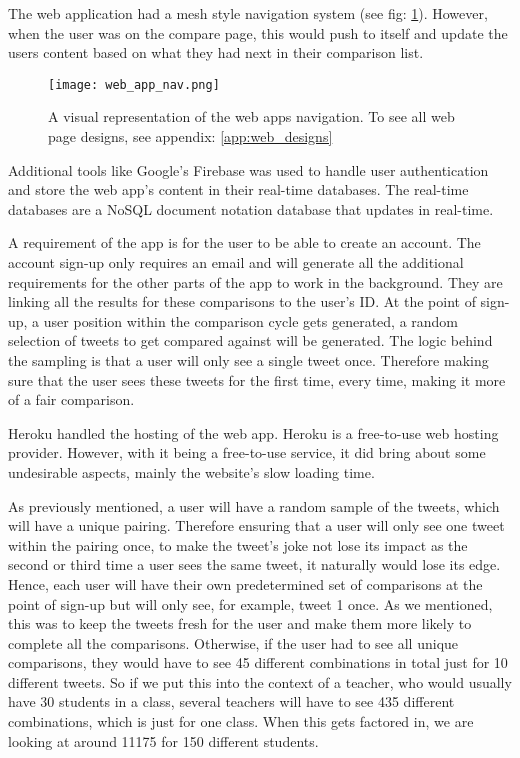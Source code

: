	The web application had a mesh style navigation system (see fig: \ref{fig:web_app_nav}). However, when the user was on the compare page, this would push to itself and update the users content based on what they had next in their comparison list.
	
	\begin{figure}[t]
		\centering
		\texttt{[image: web\_app\_nav.png]}
		\caption{A visual representation of the web apps navigation. To see all web page designs, see appendix: \ref{app:web_designs}}
		\label{fig:web_app_nav}
		
	\end{figure}
	
	Additional tools like Google's Firebase \cite{moroney2017firebase} was used to handle user authentication and store the web app's content in their real-time databases. The real-time databases are a NoSQL document notation database that updates in real-time. 
	
	A requirement of the app is for the user to be able to create an account. The account sign-up only requires an email and will generate all the additional requirements for the other parts of the app to work in the background. They are linking all the results for these comparisons to the user's ID. At the point of sign-up, a user position within the comparison cycle gets generated, a random selection of tweets to get compared against will be generated. The logic behind the sampling is that a user will only see a single tweet once. Therefore making sure that the user sees these tweets for the first time, every time, making it more of a fair comparison.
	
	Heroku \cite{middleton2013heroku} handled the hosting of the web app. Heroku is a free-to-use web hosting provider. However, with it being a free-to-use service, it did bring about some undesirable aspects, mainly the website's slow loading time.
	
	As previously mentioned, a user will have a random sample of the tweets, which will have a unique pairing. Therefore ensuring that a user will only see one tweet within the pairing once, to make the tweet's joke not lose its impact as the second or third time a user sees the same tweet, it naturally would lose its edge. Hence, each user will have their own predetermined set of comparisons at the point of sign-up but will only see, for example, tweet 1 once. As we mentioned, this was to keep the tweets fresh for the user and make them more likely to complete all the comparisons. Otherwise, if the user had to see all unique comparisons, they would have to see 45 different combinations in total just for 10 different tweets. So if we put this into the context of a teacher, who would usually have 30 students in a class, several teachers will have to see 435 different combinations, which is just for one class. When this gets factored in, we are looking at around 11175 for 150 different students.
	
